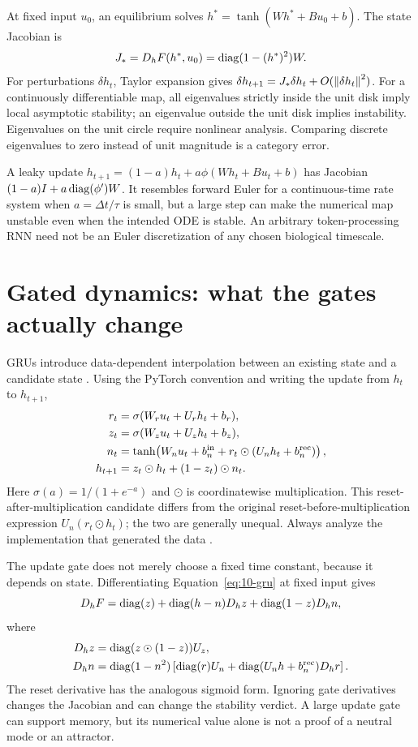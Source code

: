 At fixed input $u_0$, an equilibrium solves $h^*=\tanh(Wh^*+Bu_0+b)$. The state Jacobian is
\begin{equation}
 J_* =D_hF(h^*,u_0)=\operatorname{diag}(1-(h^*)^2)W.\label{eq:10-jac}
\end{equation}
For perturbations $\delta h_t$, Taylor expansion gives $\delta h_{t+1}=J_*\delta h_t+O(\left\lVert \delta h_t\right\rVert^2)$. For a continuously differentiable map, all eigenvalues strictly inside the unit disk imply local asymptotic stability; an eigenvalue outside the unit disk implies instability. Eigenvalues on the unit circle require nonlinear analysis. Comparing discrete eigenvalues to zero instead of unit magnitude is a category error.

A leaky update $h_{t+1}=(1-a)h_t+a\phi(Wh_t+Bu_t+b)$ has Jacobian $(1-a)I+a\operatorname{diag}(\phi')W$. It resembles forward Euler for a continuous-time rate system when $a=\Delta t/\tau$ is small, but a large step can make the numerical map unstable even when the intended ODE is stable. An arbitrary token-processing RNN need not be an Euler discretization of any chosen biological timescale.

\section{Gated dynamics: what the gates actually change}
GRUs introduce data-dependent interpolation between an existing state and a candidate state \citep{app_cho2014}. Using the PyTorch convention and writing the update from $h_t$ to $h_{t+1}$,
\begin{align}
 r_t&=\sigma(W_ru_t+U_rh_t+b_r),\\
 z_t&=\sigma(W_zu_t+U_zh_t+b_z),\\
 n_t&=\tanh\!\left(W_nu_t+b_n^{\rm in}
                  +r_t\odot(U_nh_t+b_n^{\rm rec})\right),\\
 h_{t+1}&=z_t\odot h_t+(1-z_t)\odot n_t.
 \label{eq:10-gru}
\end{align}
Here $\sigma(a)=1/(1+e^{-a})$ and $\odot$ is coordinatewise multiplication. This reset-after-multiplication candidate differs from the original reset-before-multiplication expression $U_n(r_t\odot h_t)$; the two are generally unequal. Always analyze the implementation that generated the data \citep{app_torchgru}.

The update gate does not merely choose a fixed time constant, because it depends on state. Differentiating Equation~\eqref{eq:10-gru} at fixed input gives
\begin{equation}
 D_hF=\operatorname{diag}(z)+\operatorname{diag}(h-n)D_hz+\operatorname{diag}(1-z)D_hn,\label{eq:10-grujac}
\end{equation}
where
\begin{align}
 D_hz&=\operatorname{diag}(z\odot(1-z))U_z,\\
 D_hn&=\operatorname{diag}(1-n^2)
  \left[\operatorname{diag}(r)U_n+\operatorname{diag}(U_nh+b_n^{\rm rec})D_hr\right].
\end{align}
The reset derivative has the analogous sigmoid form. Ignoring gate derivatives changes the Jacobian and can change the stability verdict. A large update gate can support memory, but its numerical value alone is not a proof of a neutral mode or an attractor.


